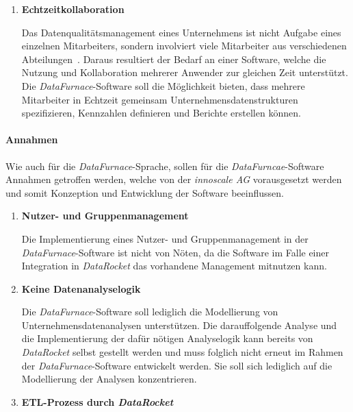 \documentclass[
  language=german, %
  type=bachelor,%
  ngerman
]{isthesis}
\begin{document}
\begin{content}
\begin{enumerate}
    \item \textbf{Echtzeitkollaboration}

			Das Datenqualitätsmanagement eines Unternehmens ist nicht Aufgabe eines
			einzelnen Mitarbeiters, sondern involviert viele Mitarbeiter aus
			verschiedenen Abteilungen~\cite[][S. 2]{geiger2004data}. Daraus resultiert der
			Bedarf an einer Software, welche die Nutzung und Kollaboration mehrerer
			Anwender zur gleichen Zeit unterstützt. Die \textit{DataFurnace}-Software
			soll die Möglichkeit bieten, dass mehrere Mitarbeiter in Echtzeit gemeinsam
			Unternehmensdatenstrukturen spezifizieren, Kennzahlen
			definieren und Berichte erstellen können.
      
  \end{enumerate}


	\paragraph{Annahmen} Wie auch für die \textit{DataFurnace}-Sprache, sollen
	für die \textit{DataFurncae}-Software Annahmen getroffen werden, welche von der
	\textit{innoscale AG} vorausgesetzt werden und somit Konzeption und
	Entwicklung der Software beeinflussen.

  \begin{enumerate}
    \item \textbf{Nutzer- und Gruppenmanagement}

		Die Implementierung eines Nutzer- und Gruppenmanagement in der
		\textit{DataFurnace}-Software ist nicht von Nöten, da die Software im
		Falle einer Integration in \textit{DataRocket} das vorhandene Management
		mitnutzen kann.

    \item \textbf{Keine Datenanalyselogik}

      Die \textit{DataFurnace}-Software soll lediglich die Modellierung von
      Unternehmensdatenanalysen unterstützen. Die darauffolgende Analyse und
      die Implementierung der dafür nötigen Analyselogik kann bereits von
      \textit{DataRocket} selbst gestellt werden und muss folglich nicht erneut
      im Rahmen der \textit{DataFurnace}-Software entwickelt werden. Sie soll
      sich lediglich auf die Modellierung der Analysen konzentrieren.

    \item \textbf{\acrshort{ETL}-Prozess durch \textit{DataRocket}}


\end{enumerate}
\end{content}
\end{document}
